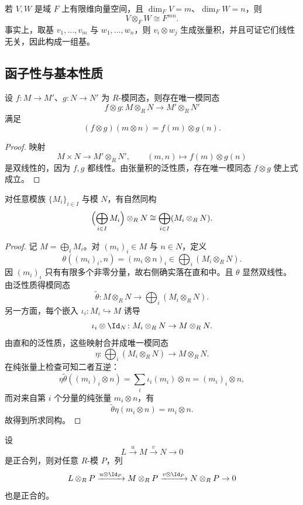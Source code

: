 \begin{example}
若 $V,W$ 是域 $F$ 上有限维向量空间，且 $\dim_FV=m$、$\dim_FW=n$，则
\[
V\otimes_F W\cong F^{mn}.
\]
事实上，取基 $v_1,\dots,v_m$ 与 $w_1,\dots,w_n$，则 $v_i\otimes w_j$ 生成张量积，并且可证它们线性无关，因此构成一组基。
\end{example}

\subsection{函子性与基本性质}

\begin{proposition}[函子性]
设 $f\colon M\to M'$、$g\colon N\to N'$ 为 $R$-模同态，则存在唯一模同态
\[
f\otimes g\colon M\otimes_R N\to M'\otimes_R N'
\]
满足
\[
(f\otimes g)(m\otimes n)=f(m)\otimes g(n).
\]
\end{proposition}

\begin{proof}
映射
\[
M\times N\to M'\otimes_R N',
\qquad (m,n)\mapsto f(m)\otimes g(n)
\]
是双线性的，因为 $f,g$ 都线性。由张量积的泛性质，存在唯一模同态 $f\otimes g$ 使上式成立。
\end{proof}

\begin{proposition}
对任意模族 $\{M_i\}_{i\in I}$ 与模 $N$，有自然同构
\[
\Bigl(\bigoplus_{i\in I} M_i\Bigr)\otimes_R N\cong \bigoplus_{i\in I}(M_i\otimes_R N).
\]
\end{proposition}

\begin{proof}
记 $M=\bigoplus_i M_i$。对 $(m_i)_i\in M$ 与 $n\in N$，定义
\[
\theta((m_i)_i,n)=(m_i\otimes n)_i\in \bigoplus_i(M_i\otimes_R N).
\]
因 $(m_i)_i$ 只有有限多个非零分量，故右侧确实落在直和中。且 $\theta$ 显然双线性。由泛性质得模同态
\[
\widetilde\theta\colon M\otimes_R N\to \bigoplus_i(M_i\otimes_R N).
\]
另一方面，每个嵌入 $\iota_i\colon M_i\hookrightarrow M$ 诱导
\[
\iota_i\otimes \Id_N\colon M_i\otimes_R N\to M\otimes_R N.
\]
由直和的泛性质，这些映射合并成唯一模同态
\[
\eta\colon \bigoplus_i(M_i\otimes_R N)\to M\otimes_R N.
\]
在纯张量上检查可知二者互逆：
\[
\eta\widetilde\theta((m_i)_i\otimes n)=\sum_i \iota_i(m_i)\otimes n=(m_i)_i\otimes n,
\]
而对来自第 $i$ 个分量的纯张量 $m_i\otimes n$，有
\[
\widetilde\theta\eta(m_i\otimes n)=m_i\otimes n.
\]
故得到所求同构。
\end{proof}

\begin{theorem}[右正合性]
设
\[
L\xrightarrow{u} M\xrightarrow{v} N\to 0
\]
是正合列，则对任意 $R$-模 $P$，列
\[
L\otimes_R P\xrightarrow{u\otimes \Id_P} M\otimes_R P\xrightarrow{v\otimes \Id_P} N\otimes_R P\to 0
\]
也是正合的。
\end{theorem}

